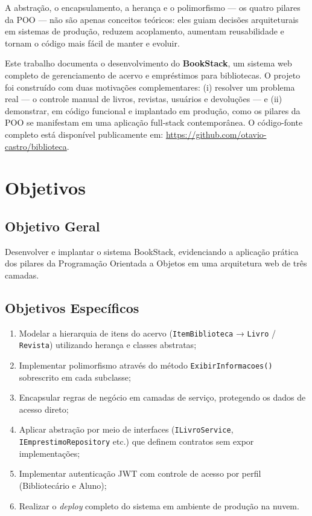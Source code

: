 \documentclass[
  12pt,
  a4paper,
  oneside,
  brazil
]{abntex2}
\begin{document}
A abstração, o encapsulamento, a herança e o polimorfismo — os quatro pilares da POO — não são apenas conceitos teóricos: eles guiam decisões arquiteturais em sistemas de produção, reduzem acoplamento, aumentam reusabilidade e tornam o código mais fácil de manter e evoluir.

Este trabalho documenta o desenvolvimento do \textbf{BookStack}, um sistema web completo de gerenciamento de acervo e empréstimos para bibliotecas. O projeto foi construído com duas motivações complementares: (i) resolver um problema real — o controle manual de livros, revistas, usuários e devoluções — e (ii) demonstrar, em código funcional e implantado em produção, como os pilares da POO se manifestam em uma aplicação full-stack contemporânea. O código-fonte completo está disponível publicamente em: \url{https://github.com/otavio-castro/biblioteca}.

\section{Objetivos}

\subsection{Objetivo Geral}

Desenvolver e implantar o sistema BookStack, evidenciando a aplicação prática dos pilares da Programação Orientada a Objetos em uma arquitetura web de três camadas.

\subsection{Objetivos Específicos}

\begin{enumerate}[label=\alph*)]
  \item Modelar a hierarquia de itens do acervo (\texttt{ItemBiblioteca} → \texttt{Livro} / \texttt{Revista}) utilizando herança e classes abstratas;
  \item Implementar polimorfismo através do método \texttt{ExibirInformacoes()} sobrescrito em cada subclasse;
  \item Encapsular regras de negócio em camadas de serviço, protegendo os dados de acesso direto;
  \item Aplicar abstração por meio de interfaces (\texttt{ILivroService}, \texttt{IEmprestimoRepository} etc.) que definem contratos sem expor implementações;
  \item Implementar autenticação JWT com controle de acesso por perfil (Bibliotecário e Aluno);
  \item Realizar o \textit{deploy} completo do sistema em ambiente de produção na nuvem.
\end{enumerate}
\end{document}
